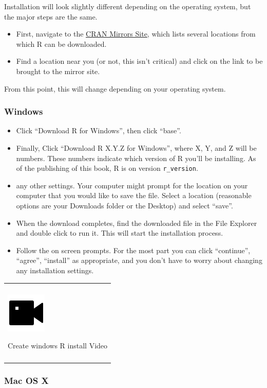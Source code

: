 \documentclass[
]{book}
\providecommand{\tightlist}{%
  \setlength{\itemsep}{0pt}\setlength{\parskip}{0pt}}
\newenvironment{video}
{
  \begin{center}
  \begin{tabular}{|>{\columncolor{video}}p{0.9\textwidth}|}
  \hline\\
  \includegraphics[scale=0.1]{src/images/vidicon-fill.png}
}
{\\\\\hline
  \end{tabular}
  \end{center}
}
\begin{document}
Installation will look slightly different depending on the operating system, but the major steps are the same.

\begin{itemize}
\tightlist
\item
  First, navigate to the \href{https://cran.r-project.org/mirrors.html}{CRAN Mirrors Site}, which lists several locations from which R can be downloaded.
\item
  Find a location near you (or not, this isn't critical) and click on the link to be brought to the mirror site.
\end{itemize}

From this point, this will change depending on your operating system.

\hypertarget{windows}{%
\subsubsection{Windows}\label{windows}}

\begin{itemize}
\tightlist
\item
  Click ``Download R for Windows'', then click ``base''.
\item
  Finally, Click ``Download R X.Y.Z for Windows'', where X, Y, and Z will be numbers. These numbers indicate which version of R you'll be installing. As of the publishing of this book, R is on version \texttt{r\_version}.
\item
  any other settings. Your computer might prompt for the location on your computer that you would like to save the file. Select a location (reasonable options are your Downloads folder or the Desktop) and select ``save''.
\item
  When the download completes, find the downloaded file in the File Explorer and double click to run it. This will start the installation process.
\item
  Follow the on screen prompts. For the most part you can click ``continue'', ``agree'', ``install'' as appropriate, and you don't have to worry about changing any installation settings.
\end{itemize}

\begin{video}
Create windows R install Video
\end{video}

\hypertarget{mac-os-x}{%
\subsubsection{Mac OS X}\label{mac-os-x}}
\end{document}
